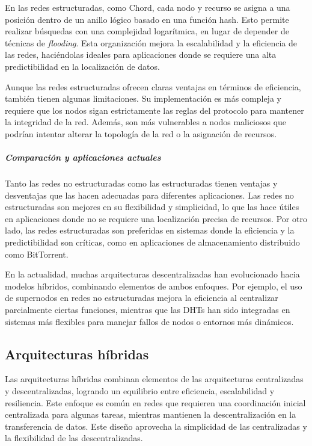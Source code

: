En las redes estructuradas, como Chord, cada nodo y recurso se asigna a una posición dentro de un anillo lógico basado en una función hash.
Esto permite realizar búsquedas con una complejidad logarítmica, en lugar de depender de técnicas de \textit{flooding}.
Esta organización mejora la escalabilidad y la eficiencia de las redes, haciéndolas ideales para aplicaciones donde se requiere una alta predictibilidad en la localización de datos.

Aunque las redes estructuradas ofrecen claras ventajas en términos de eficiencia, también tienen algunas limitaciones.
Su implementación es más compleja y requiere que los nodos sigan estrictamente las reglas del protocolo para mantener la integridad de la red.
Además, son más vulnerables a nodos maliciosos que podrían intentar alterar la topología de la red o la asignación de recursos.

\subparagraph{Comparación y aplicaciones actuales}

Tanto las redes no estructuradas como las estructuradas tienen ventajas y desventajas que las hacen adecuadas para diferentes aplicaciones.
Las redes no estructuradas son mejores en su flexibilidad y simplicidad, lo que las hace útiles en aplicaciones donde no se requiere una localización precisa de recursos.
Por otro lado, las redes estructuradas son preferidas en sistemas donde la eficiencia y la predictibilidad son críticas,
como en aplicaciones de almacenamiento distribuido como BitTorrent.

En la actualidad, muchas arquitecturas descentralizadas han evolucionado hacia modelos híbridos, combinando elementos de ambos enfoques.
Por ejemplo, el uso de supernodos en redes no estructuradas mejora la eficiencia al centralizar parcialmente ciertas funciones,
mientras que las DHTs han sido integradas en sistemas más flexibles para manejar fallos de nodos o entornos más dinámicos.


\subsection{Arquitecturas híbridas}

Las arquitecturas híbridas combinan elementos de las arquitecturas centralizadas y descentralizadas, logrando un equilibrio entre eficiencia, escalabilidad y resiliencia.
Este enfoque es común en redes que requieren una coordinación inicial centralizada para algunas tareas, mientras mantienen la descentralización en la transferencia de datos.
Este diseño aprovecha la simplicidad de las centralizadas y la flexibilidad de las descentralizadas.

